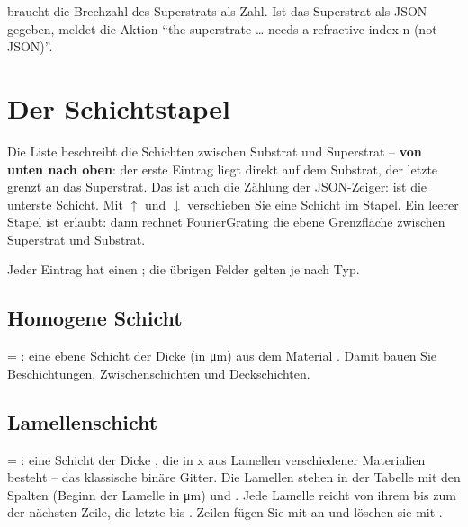 \begin{hinweis}
 braucht die Brechzahl des Superstrats als Zahl. Ist das Superstrat als JSON
gegeben, meldet die Aktion \enquote{the superstrate … needs a refractive index n (not JSON)}.
\end{hinweis}

\section{Der Schichtstapel}\label{sec:fg-schichten}

Die Liste  beschreibt die Schichten zwischen Substrat und Superstrat --
\textbf{von unten nach oben}: der erste Eintrag liegt direkt auf dem Substrat, der letzte grenzt an
das Superstrat. Das ist auch die Zählung der JSON-Zeiger:  ist die unterste
Schicht. Mit $\uparrow$ und $\downarrow$ verschieben Sie eine Schicht im Stapel. Ein leerer Stapel
ist erlaubt: dann rechnet FourierGrating die ebene Grenzfläche zwischen Superstrat und Substrat.

Jeder Eintrag hat einen ; die übrigen Felder gelten je nach Typ.

\subsection{Homogene Schicht}

 = : eine ebene Schicht der Dicke  (in
\si{\micro\metre}) aus dem Material . Damit bauen Sie Beschichtungen,
Zwischenschichten und Deckschichten.

\subsection{Lamellenschicht}\label{sec:fg-lamellen}

 = : eine Schicht der Dicke , die in x aus Lamellen
verschiedener Materialien besteht -- das klassische binäre Gitter. Die Lamellen stehen in der
Tabelle  mit den Spalten  (Beginn der Lamelle in
\si{\micro\metre}) und . Jede Lamelle reicht von ihrem  bis zum
 der nächsten Zeile, die letzte bis . Zeilen fügen Sie mit
 an und löschen sie mit .

